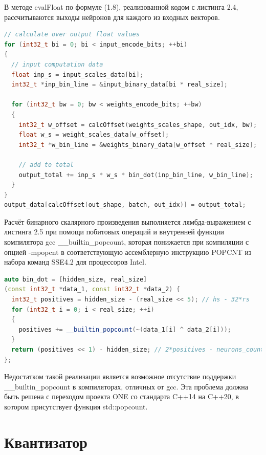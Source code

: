 В методе evalFloat по формуле (1.8), реализованной кодом с листинга 2.4, рассчитываются выходы нейронов для каждого из входных векторов. 

\begin{lstlisting}[language=C++, caption={Расчет выходов слоя}]
// calculate over output float values
for (int32_t bi = 0; bi < input_encode_bits; ++bi)
{
  // input computation data
  float inp_s = input_scales_data[bi];
  int32_t *inp_bin_line = &input_binary_data[bi * real_size];

  for (int32_t bw = 0; bw < weights_encode_bits; ++bw)
  {
    int32_t w_offset = calcOffset(weights_scales_shape, out_idx, bw);
    float w_s = weight_scales_data[w_offset];
    int32_t *w_bin_line = &weights_binary_data[w_offset * real_size];

    // add to total
    output_total += inp_s * w_s * bin_dot(inp_bin_line, w_bin_line);
  }
}
output_data[calcOffset(out_shape, batch, out_idx)] = output_total;
\end{lstlisting}

Расчёт бинарного скалярного произведения выполняется лямбда-выражением с листинга 2.5 при помощи побитовых операций и внутренней функции компилятора gcc \_\_builtin\_popcount, которая понижается при компиляции с опцией -mpopcnt в соответствующую ассемблерную инструкцию POPCNT из набора команд SSE4.2 для процессоров Intel.

\begin{lstlisting}[language=C++, caption={Бинарное скалярное произведение}]
auto bin_dot = [hidden_size, real_size]
(const int32_t *data_1, const int32_t *data_2) {
  int32_t positives = hidden_size - (real_size << 5); // hs - 32*rs
  for (int32_t i = 0; i < real_size; ++i)
  {
    positives += __builtin_popcount(~(data_1[i] ^ data_2[i]));
  }
  return (positives << 1) - hidden_size; // 2*positives - neurons_count
};
\end{lstlisting}

Недостатком такой реализации является возможное отсутствие поддержки \_\_builtin\_popcount в компиляторах, отличных от gcc. Эта проблема должна быть решена с переходом проекта ONE со  стандарта C++14 на C++20, в котором присутствует функция std::popcount.

\section{Квантизатор}

